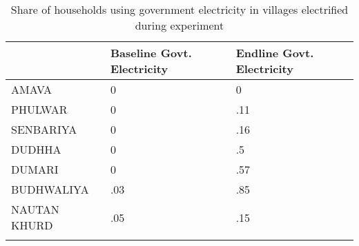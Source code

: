 \begin{table}[h] \centering%
\caption{Share of households using government electricity in villages electrified during experiment}%
\begin{tabularx}{\textwidth}{lCC}
\toprule
&Baseline Govt. Electricity&Endline Govt. Electricity \tabularnewline
\midrule\addlinespace[1.5ex]
AMAVA&0&0 \tabularnewline
PHULWAR&0&.11 \tabularnewline
SENBARIYA&0&.16 \tabularnewline
DUDHHA&0&.5 \tabularnewline
DUMARI&0&.57 \tabularnewline
BUDHWALIYA&.03&.85 \tabularnewline
NAUTAN KHURD&.05&.15 \tabularnewline
\bottomrule \addlinespace[1.5ex]
\end{tabularx}%
\end{table}%
